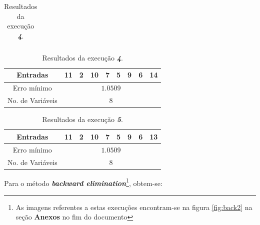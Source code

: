 \begin{enumerate}
\begin{enumerate}
\begin{table}[H]
\begin{minipage}{0.48\textwidth}
\begin{tabular}{|c | c | c | c | c | c | c | c | c |}
						\end{tabular}	    
					\end{minipage}	    
					\begin{minipage}{0.48\textwidth}
					    \centering
					    \footnotesize
						\caption{\label{tab:forward4_wine} Resultados da execução
						\textit{\textbf{4}}.}
					    \vspace{-6pt}
						\begin{tabular}{|c | c | c | c | c | c | c | c | c|}
						\hline
						Entradas & 11 & 2 & 10 & 7 & 5 & 9 & 6 & 14 \\
						\hline
						Erro mínimo & \multicolumn{8}{c|}{\(1.0509\)}  \\ \hline
						No. de Variáveis & \multicolumn{8}{c|}{\(8\)}  \\
						\hline
						
						\end{tabular}
					\end{minipage}	    
			    \end{table} 
			    
			\vspace{-12pt}

			\begin{table}[H]
				    \centering
				    \footnotesize
					\caption{\label{tab:forward5_wine} Resultados da execução
					\textit{\textbf{5}}.}
				    \vspace{-6pt}
					\begin{tabular}{|c | c | c | c | c | c | c | c | c|}
					\hline
					Entradas & 11 & 2 & 10 & 7 & 5 & 9 & 6 & 13 \\
					\hline
					Erro mínimo & \multicolumn{8}{c|}{\(1.0509\)}  \\ \hline
					No. de Variáveis & \multicolumn{8}{c|}{\(8\)}  \\
					\hline
					
					\end{tabular}	    
			    \end{table} 
	
			    \FloatBarrier
			    
			Para o método \textbf{\textit{backward elimination}}\footnote{As
			imagens referentes a estas execuções encontram-se na figura \ref{fig:back2}
			na seção \textbf{Anexos} no fim do documento}, obtem-se:
			

\end{enumerate}
\end{enumerate}
